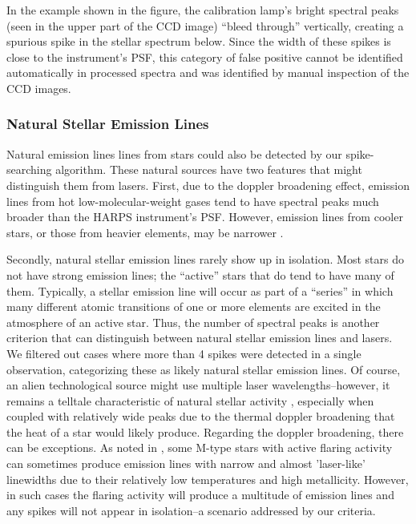 \documentclass[twocolumn]{aastex701}
\begin{document}
In the example shown in the figure, the calibration lamp's bright spectral peaks (seen in the upper part of the CCD image) ``bleed through'' vertically, creating a spurious spike in the stellar spectrum below.  Since the width of these spikes is close to the instrument's PSF, this category of false positive cannot be identified automatically in processed spectra and was identified by manual inspection of the CCD images.

\subsubsection{Natural Stellar Emission Lines}
\label{s:stellaremission}
Natural emission lines lines from stars could also be detected by our spike-searching algorithm.  These natural sources have two features that might distinguish them from lasers.  First, due to the doppler broadening effect, emission lines from hot low-molecular-weight gases tend to have spectral peaks much broader than the HARPS instrument's PSF. However, emission lines from cooler stars, or those from heavier elements, may be narrower \citep{Livadiotis_2018}.
 
Secondly, natural stellar emission lines rarely show up in isolation. Most stars do not have strong emission lines; the ``active'' stars that do tend to have many of them. Typically, a stellar emission line will occur as part of a “series” in which many different atomic transitions of one or more elements are excited in the atmosphere of an active star.  Thus, the number of spectral peaks is another criterion that can distinguish between natural stellar emission lines and lasers. We filtered out cases where more than 4 spikes were detected in a single observation, categorizing these as likely natural stellar emission lines.  Of course, an alien technological source might use multiple laser wavelengths--however, it remains a telltale characteristic of natural stellar activity \citep{Livadiotis_2018}, especially when coupled with relatively wide peaks due to the thermal doppler broadening that the heat of a star would likely produce. Regarding the doppler broadening, there can be exceptions. As noted in \citep{ProximaCentauri}, some M-type stars with active flaring activity can sometimes produce emission lines  with  narrow and almost 'laser-like' linewidths due to their relatively low temperatures and high metallicity. However, in such cases the flaring activity will produce a multitude of emission lines and any spikes will not appear in isolation--a scenario addressed by our  criteria.
\end{document}
